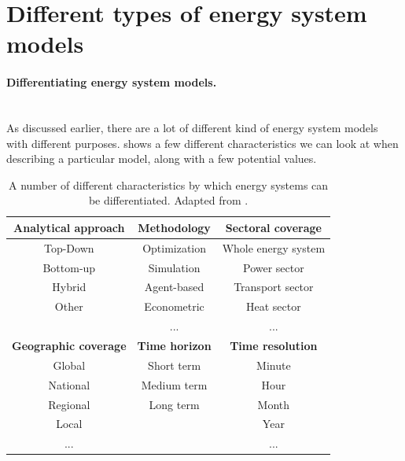 

\section{Different types of energy system models}

\paragraph{Differentiating energy system models.}~\\


As discussed earlier, there are a lot of different kind of energy system models with different purposes.  shows a few different characteristics we can look at when describing a particular model, along with a few potential values.~\\


\begin{table}[!t]
\caption[Classification of energy models.]{A number of different characteristics by which energy systems can be differentiated. Adapted from \cite{hall_review_2016}.}
\begin{tabular}{c c c }
\toprule
\bfseries Analytical approach  & \bfseries Methodology & \bfseries Sectoral coverage \\
\toprule
Top-Down  & Optimization & Whole energy system \\
Bottom-up & Simulation & Power sector  \\
Hybrid & Agent-based & Transport sector \\
Other& Econometric & Heat sector   \\
& ... & ... \\
\midrule
\bfseries Geographic coverage & \bfseries Time horizon &  \bfseries Time resolution\\
\midrule
Global &  Short term & Minute \\
National &  Medium term  & Hour \\
Regional &  Long term & Month\\
Local & & Year \\
... & & ...\\
\bottomrule
\end{tabular}
\end{table}

